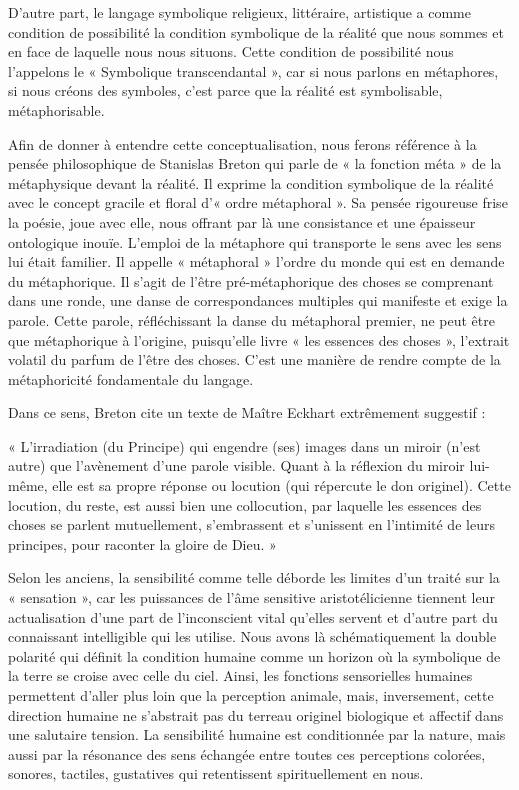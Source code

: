 D’autre part, le langage symbolique religieux, littéraire, artistique a comme condition de possibilité la condition symbolique de la réalité que nous sommes et en face de laquelle nous nous situons. Cette condition de possibilité nous l’appelons le « Symbolique transcendantal », car si nous parlons en métaphores, si nous créons des symboles, c’est parce que la réalité est symbolisable, métaphorisable.

Afin de donner à entendre cette conceptualisation, nous ferons référence à la pensée philosophique de Stanislas Breton qui parle de « la fonction méta » de la métaphysique devant la réalité. Il exprime la condition symbolique de la réalité avec le concept gracile et floral d’« ordre métaphoral ». Sa pensée rigoureuse frise la poésie, joue avec elle, nous offrant par là une consistance et une épaisseur ontologique inouïe. L’emploi de la métaphore qui transporte le sens avec les sens lui était familier. Il appelle « métaphoral » l’ordre du monde qui est en demande du métaphorique. Il s’agit de l’être pré-métaphorique des choses se comprenant dans une ronde, une danse de correspondances multiples qui manifeste et exige la parole. Cette parole, réfléchissant la danse du métaphoral premier, ne peut être que métaphorique à l’origine, puisqu’elle livre « les essences des choses », l’extrait volatil du parfum de l’être des choses. C’est une manière de rendre compte de la métaphoricité fondamentale du langage.

Dans ce sens, Breton cite un texte de Maître Eckhart extrêmement suggestif :

\vspace{0.24cm}
{\footnotesize « L’irradiation (du Principe) qui engendre (ses) images dans un miroir (n’est autre) que l’avènement d’une parole visible. Quant à la réflexion du miroir lui-même, elle est sa propre réponse ou locution (qui répercute le don originel). Cette locution, du reste, est aussi bien une collocution, par laquelle les essences des choses se parlent mutuellement, s’embrassent et s’unissent en l’intimité de leurs principes, pour raconter la gloire de Dieu. »}
\vspace{0.31cm}

Selon les anciens, la sensibilité comme telle déborde les limites d’un traité sur la « sensation », car les puissances de l’âme sensitive aristotélicienne tiennent leur actualisation d’une part de l’inconscient vital qu’elles servent et d’autre part du connaissant intelligible qui les utilise. Nous avons là schématiquement la double polarité qui définit la condition humaine comme un horizon où la symbolique de la terre se croise avec celle du ciel. Ainsi, les fonctions sensorielles humaines permettent d’aller plus loin que la perception animale, mais, inversement, cette direction humaine ne s’abstrait pas du terreau originel biologique et affectif dans une salutaire tension. La sensibilité humaine est conditionnée par la nature, mais aussi par la résonance des sens échangée entre toutes ces perceptions colorées, sonores, tactiles, gustatives qui retentissent spirituellement en nous.

